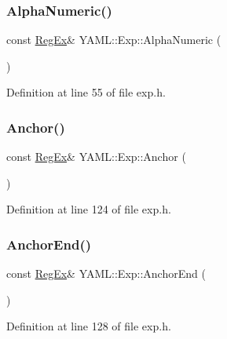 \subsubsection{\texorpdfstring{AlphaNumeric()}{AlphaNumeric()}}
{\footnotesize\ttfamily const \mbox{\hyperlink{class_y_a_m_l_1_1_reg_ex}{Reg\+Ex}}\& Y\+A\+M\+L\+::\+Exp\+::\+Alpha\+Numeric (\begin{DoxyParamCaption}{ }\end{DoxyParamCaption})\hspace{0.3cm}{\ttfamily [inline]}}



Definition at line 55 of file exp.\+h.

\mbox{\label{namespace_y_a_m_l_1_1_exp_aa5626ff2fafa6d98d0118f12e4db6efc}} 
\subsubsection{\texorpdfstring{Anchor()}{Anchor()}}
{\footnotesize\ttfamily const \mbox{\hyperlink{class_y_a_m_l_1_1_reg_ex}{Reg\+Ex}}\& Y\+A\+M\+L\+::\+Exp\+::\+Anchor (\begin{DoxyParamCaption}{ }\end{DoxyParamCaption})\hspace{0.3cm}{\ttfamily [inline]}}



Definition at line 124 of file exp.\+h.

\mbox{\label{namespace_y_a_m_l_1_1_exp_a2f3bd5ab82bf10a31b2ca262220fa01d}} 
\subsubsection{\texorpdfstring{AnchorEnd()}{AnchorEnd()}}
{\footnotesize\ttfamily const \mbox{\hyperlink{class_y_a_m_l_1_1_reg_ex}{Reg\+Ex}}\& Y\+A\+M\+L\+::\+Exp\+::\+Anchor\+End (\begin{DoxyParamCaption}{ }\end{DoxyParamCaption})\hspace{0.3cm}{\ttfamily [inline]}}



Definition at line 128 of file exp.\+h.

